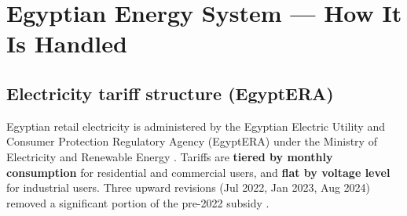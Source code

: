 \documentclass[11pt,a4paper]{article}
\begin{document}
\section{Egyptian Energy System --- How It Is Handled}
\label{sec:egy_energy}

\subsection{Electricity tariff structure (EgyptERA)}
Egyptian retail electricity is administered by the Egyptian Electric Utility and Consumer Protection Regulatory Agency (EgyptERA) under the Ministry of Electricity and Renewable Energy \citep{egyptera_tariff_2024}. Tariffs are \textbf{tiered by monthly consumption} for residential and commercial users, and \textbf{flat by voltage level} for industrial users. Three upward revisions (Jul 2022, Jan 2023, Aug 2024) removed a significant portion of the pre-2022 subsidy \citep{egypt_subsidy_reform_2024}.
\end{document}
